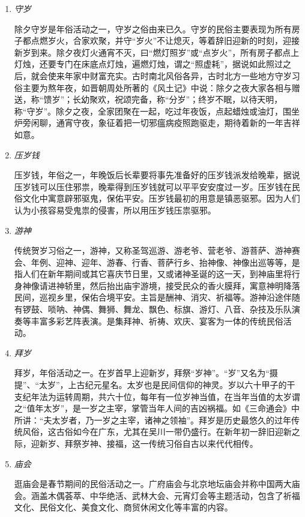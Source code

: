 \begin{enumerate}
\item \emph{守岁}

除夕守岁是年俗活动之一，守岁之俗由来已久。守岁的民俗主要表现为所有房子都点燃岁火，合家欢聚，并守“岁火”不让熄灭，等着辞旧迎新的时刻，迎接新岁到来。除夕夜灯火通宵不灭，曰“燃灯照岁”或“点岁火”，所有房子都点上灯烛，还要专门在床底点灯烛，遍燃灯烛，谓之“照虚耗”，据说如此照过之后，就会使来年家中财富充实。古时南北风俗各异，古时北方一些地方守岁习俗主要为熬年夜，如晋朝周处所著的《风土记》中说：除夕之夜大家各相与赠送，称“馈岁”；长幼聚欢，祝颂完备，称“分岁”；终岁不眠，以待天明，称“守岁”。除夕之夜，全家团聚在一起，吃过年夜饭，点起蜡烛或油灯，围坐炉旁闲聊，通宵守夜，象征着把一切邪瘟病疫照跑驱走，期待着新的一年吉祥如意。

\item \emph{压岁钱}

压岁钱，年俗之一，年晚饭后长辈要将事先准备好的压岁钱派发给晚辈，据说压岁钱可以压住邪祟，晚辈得到压岁钱就可以平平安安度过一岁。压岁钱在民俗文化中寓意辟邪驱鬼，保佑平安。压岁钱最初的用意是镇恶驱邪。因为人们认为小孩容易受鬼祟的侵害，所以用压岁钱压祟驱邪。

\item \emph{游神}

传统贺岁习俗之一，游神，又称圣驾巡游、游老爷、营老爷、游菩萨、游神赛会、年例、迎神、迎年、游春、行香、菩萨行乡、抬神像、神像出巡等等，是指人们在新年期间或其它喜庆节日里，又或诸神圣诞的这一天，到神庙里将行身神像请进神轿里，然后抬出庙宇游境，接受民众的香火膜拜，寓意神明降落民间，巡视乡里，保佑合境平安。主旨是酬神、消灾、祈福等。游神沿途伴随有锣鼓、唢呐、神偶、舞狮、舞龙、飘色、标旗、游灯、八音、杂技及乐队演奏等丰富多彩艺阵表演。是集拜神、祈祷、欢庆、宴客为一体的传统民俗活动。

\item \emph{拜岁}

拜岁，年俗活动之一。在岁首早上迎新岁，拜祭“岁神”。“岁”又名为“摄提”、“太岁”，上古纪元星名。太岁也是民间信仰的神灵。岁以六十甲子的干支纪年法为运转周期，共六十位，每年有一位岁神当值，在当年当值的太岁谓之“值年太岁”，是一岁之主宰，掌管当年人间的吉凶祸福。如《三命通会》中所讲：“夫太岁者，乃一岁之主宰，诸神之领袖”。拜岁是历史最悠久的过年传统风俗，这古俗如今在广东，尤其在吴川一带仍盛行。在新年初一辞旧迎新之际，迎新岁、拜祭岁神、接福，这一传统习俗自古以来代代相传。

\item \emph{庙会}

逛庙会是春节期间的民俗活动之一。广府庙会与北京地坛庙会并称中国两大庙会。涵盖木偶荟萃、中华绝活、武林大会、元宵灯会等主题活动，包含了祈福文化、民俗文化、美食文化、商贸休闲文化等丰富的内容。


\end{enumerate}

